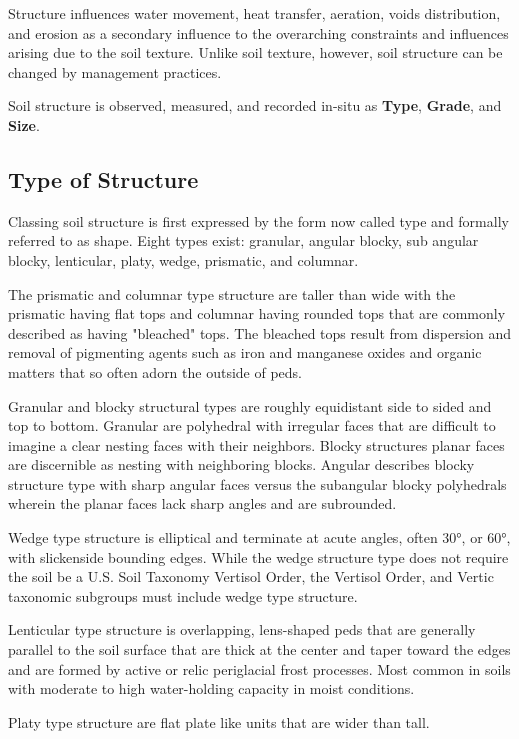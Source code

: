 \documentclass{article}
\begin{document}
Structure influences water movement, heat transfer, aeration, voids distribution, and erosion as a secondary influence to the overarching constraints and influences arising due to the soil texture. Unlike soil texture, however, soil structure can be changed by management practices.
    
Soil structure is observed, measured, and recorded in-situ as \textbf{Type}, \textbf{Grade}, and \textbf{Size}.
    
\subsection{Type of Structure}
    
Classing soil structure is first expressed by the form now called type and formally referred to as shape. Eight types exist: granular, angular blocky, sub angular blocky, lenticular, platy, wedge, prismatic, and columnar.

The prismatic and columnar type structure are taller than wide with the prismatic having flat tops and columnar having rounded tops that are commonly described as having "bleached" tops. The bleached tops result from dispersion and removal of pigmenting agents such as iron and manganese oxides and organic matters that so often adorn the outside of peds.

Granular and blocky structural types are roughly equidistant side to sided and top to bottom. Granular are polyhedral with irregular faces that are difficult to imagine a clear nesting faces with their neighbors. Blocky structures planar faces are discernible as nesting with neighboring blocks. Angular describes blocky structure type with sharp angular faces versus the subangular blocky polyhedrals wherein the planar faces lack sharp angles and are subrounded.

Wedge type structure is elliptical and terminate at acute angles, often \ang{30}, or \ang{60}, with slickenside bounding edges. While the wedge structure type does not require the soil be a U.S. Soil Taxonomy Vertisol Order, the Vertisol Order, and Vertic taxonomic subgroups must include wedge type structure.

Lenticular type structure is overlapping, lens-shaped peds that are  generally parallel to the soil surface that are thick at the center and taper toward the edges and are formed by active or relic periglacial frost processes. Most common in soils with moderate to high water-holding capacity in moist conditions.

Platy type structure are flat plate like units that are wider than tall.
\end{document}
